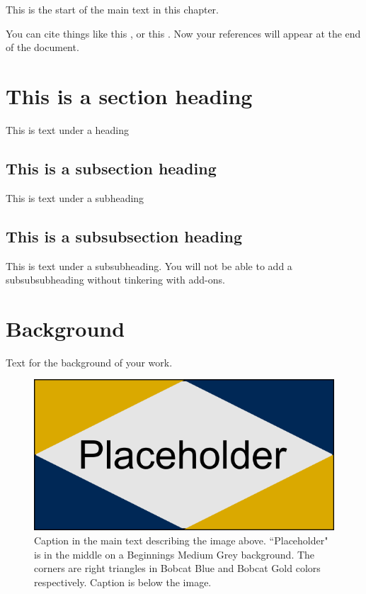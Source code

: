 

This is the start of the main text in this chapter.

You can cite things like this \cite{bib1}, or this \cite{bib2}.  Now your references will appear at the end of the document.

\section{This is a section heading}

This is text under a heading

\subsection{This is a subsection heading}

This is text under a subheading

\subsection{This is a subsubsection heading}

This is text under a subsubheading.  You will not be able to add a subsubsubheading without tinkering with add-ons.



 

\section{Background} 

Text for the background of your work.

\begin{figure}
    \centering
    \includegraphics[width=\textwidth]{Figures/Chapter_1/figure_placeholder.png}
    \caption[Placeholder caption]{Caption in the main text describing the image above.  ``Placeholder" is in the middle on a Beginnings Medium Grey background.  The corners are right triangles in Bobcat Blue and Bobcat Gold colors respectively.  Caption is below the image.}
    \label{fig:placeholder}
\end{figure}

